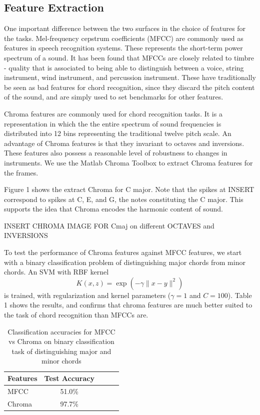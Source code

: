 \documentclass{article}
\begin{document}
\subsection{Feature Extraction}

One important difference between the two surfaces in the choice of features for the tasks. Mel-frequency cepstrum coefficients (MFCC) are commonly used as features in speech recognition systems. These represents the short-term power spectrum of a sound. It has been found that MFCCs are closely related to timbre - quality that is associated to being able to distinguish between a voice, string instrument, wind instrument, and percussion instrument. These have traditionally be seen as bad features for chord recognition, since they discard the pitch content of the sound, and are simply used to set benchmarks for other features.

Chroma features are commonly used for chord recognition tasks. It is a representation in which the the entire spectrum of sound frequencies is distributed into 12 bins representing the traditional twelve pitch scale. An advantage of Chroma features is that they invariant to octaves and inversions. These features also possess a reasonable level of robustness to changes in instruments. We use the Matlab Chroma Toolbox to extract Chroma features for the frames.

Figure 1 shows the extract Chroma for C major. Note that the spikes at INSERT correspond to spikes at C, E, and G, the notes constituting the C major. This supports the idea that Chroma encodes the harmonic content of sound.

INSERT CHROMA IMAGE FOR Cmaj on different OCTAVES and INVERSIONS

To test the performance of Chroma features against MFCC features, we start with a binary classification problem of distinguishing major chords from minor chords. An SVM with RBF kernel $$ K(x, z) = \exp(-\gamma\lVert{x - y}\rVert^2)$$ is trained, with regularization and kernel parameters ($\gamma = 1$ and $C = 100$). Table 1 shows the results, and confirms that chroma features are much better suited to the task of chord recognition than MFCCs are.
\begin{table}[t]
\caption{Classification accuracies for MFCC vs Chroma on binary classification task of distinguishing major and minor chords}
\label{mfccvschroma}
\vskip 0.15in
\begin{center}
\begin{small}
\begin{sc}
\begin{tabular}{lcccr}
\hline
\abovespace\belowspace
Features & Test Accuracy \\
\hline
\abovespace
MFCC    & 51.0\%\\
Chroma & 97.7\%\\
\hline
\end{tabular}
\end{sc}
\end{small}
\end{center}
\vskip -0.1in
\end{table}
\end{document}
